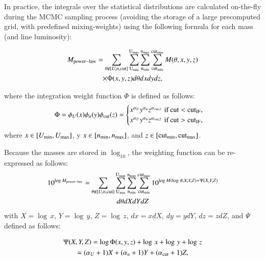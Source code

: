 \documentclass{aa}
\begin{document}
In practice, the integrals over the statistical distributions are calculated on-the-fly during the MCMC sampling process (avoiding the storage of a large precomputed grid, with predefined mixing-weights) using the following formula for each mass (and line luminosity):

\begin{multline}
\label{e1}
    M_{\rm power-law} = \sum_{\theta \notin [U,n,\rm cut]} \sum_{\rm U_{min}}^{\rm U_{max}} \sum_{\rm n_{min}}^{\rm n_{max}} \sum_{\rm cut_{min}}^{\rm cut_{max}}  M(\theta, x,y,z)\\ \times \Phi(x,y,z) d\theta dx dy dz,
\end{multline}

where the integration weight function $\Phi$ is defined as follows:
\begin{equation}
        \Phi = \phi_{U}(x)\phi_{n}(y)\phi_{\rm cut}(z)=
    \begin{cases}
        x^{\alpha_U} y^{\alpha_n}z^{\alpha_{cut,1}}\, \rm \,if\, cut < cut_{\rm IF},\\
        x^{\alpha_U} y^{\alpha_n} z^{\alpha_{cut,2}}\, \rm \,if\, cut > cut_{\rm IF},    
    \end{cases}
\end{equation}
where $x \in [U_{\rm min}, U_{\rm max}]$, y $x \in [n_{\rm min}, n_{\rm max}]$, and $z \in [{\rm cut_{min}}, {\rm cut_{max}}]$. 

Because the masses are stored in $\log_{10}$, the weighting function can be re-expressed as follows:
\begin{multline}
\label{e2}
    10^{\log M_{\rm power-law}} = \sum_{\theta \notin [U,n,\rm cut]} \sum_{\rm U_{min}}^{\rm U_{max}} \sum_{\rm n_{min}}^{\rm n_{max}} \sum_{\rm cut_{min}}^{\rm cut_{max}}  10^{\log M(\log\, \theta, X,Y,Z)+\Psi(X,Y,Z)}\\ d\theta dX dY dZ
\end{multline}
with $X=\log\, x$, $Y=\log\, y$, $Z=\log\, z$, $dx = xdX$, $dy=ydY$, $dz=zdZ$, and $\Psi$ defined as follows:

\begin{multline}
        \Psi(X,Y,Z) = \log \Phi(x,y,z)+\log\, x+\log\, y+\log\, z\\
        = (\alpha_U + 1)X + (\alpha_n + 1)Y + (\alpha_{\rm cut} + 1)Z,
\end{multline}
 
\end{document}
